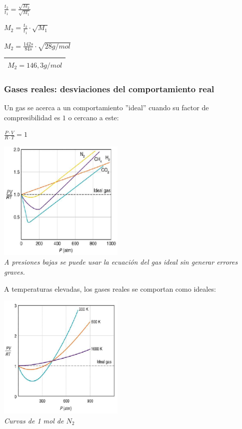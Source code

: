             \begin{center} $\frac{t_2}{t_1} = \frac{\sqrt{M_2}}{\sqrt{M_1}}$ \end{center}
            \begin{center} $M_2 = \frac{t_2}{t_1} \cdot \sqrt{M_1}$ \end{center}
            \begin{center} $M_2 = \frac{142s}{84s} \cdot \sqrt{28 g/mol}$ \end{center}
            \begin{center} \begin{tabular}{| c |} \hline $M_2 = 146,3 g/mol$ \\ \hline \end{tabular} \end{center}
        \saltoPag{}
        \subsubsection{Gases reales: desviaciones del comportamiento real}
            \sangria{} Un gas se acerca a un comportamiento ''ideal'' cuando su factor de compresibilidad es $1$ o cercano a este:
            \begin{center} $\frac{P \cdot V}{R \cdot T} = 1$ \end{center}
            \begin{center} \includegraphics[width=6cm]{./imagenes/factorDeCompresibilidadVSPresion.png} \\ \textit{A presiones bajas se puede usar la ecuación del gas ideal sin generar errores graves.} \end{center}
            \sangria{} A temperaturas elevadas, los gases reales se comportan como ideales:
            \begin{center} \includegraphics[width=6cm]{./imagenes/gasIdealATemperatuasAltas.png} \\ \textit{Curvas de 1 mol de $N_2$} \end{center}

